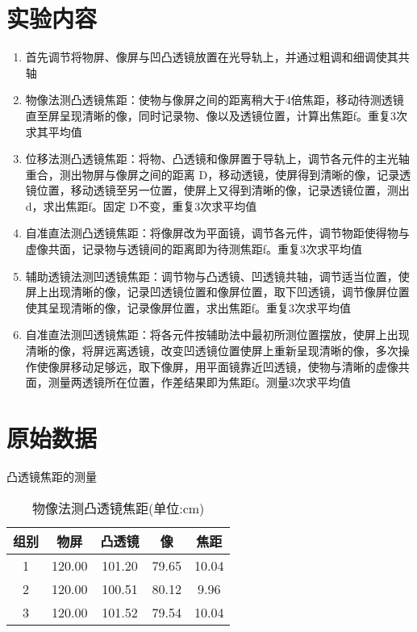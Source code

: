 \documentclass[UTF8]{ctexart}
\title{}
\author{}
\date{}
\begin{document}
\begin{titlepage}		
		
\end{titlepage}


\section{实验内容}

\begin{enumerate}
    \item 首先调节将物屏、像屏与凹凸透镜放置在光导轨上，并通过粗调和细调使其共轴
    \item 物像法测凸透镜焦距：使物与像屏之间的距离稍大于4倍焦距，移动待测透镜直至屏呈现清晰的像，同时记录物、像以及透镜位置，计算出焦距f。重复3次求其平均值
    \item 位移法测凸透镜焦距：将物、凸透镜和像屏置于导轨上，调节各元件的主光轴重合，测出物屏与像屏之间的距离 D，移动透镜，使屏得到清晰的像，记录透镜位置，移动透镜至另一位置，使屏上又得到清晰的像，记录透镜位置，测出 d，求出焦距f。固定 D不变，重复3次求平均值
    \item 自准直法测凸透镜焦距：将像屏改为平面镜，调节各元件，调节物距使得物与虚像共面，记录物与透镜间的距离即为待测焦距f。重复3次求平均值
    \item 辅助透镜法测凹透镜焦距：调节物与凸透镜、凹透镜共轴，调节适当位置，使屏上出现清晰的像，记录凹透镜位置和像屏位置，取下凹透镜，调节像屏位置使其呈现清晰的像，记录像屏位置，求出焦距f。重复3次求平均值
    \item 自准直法测凹透镜焦距：将各元件按辅助法中最初所测位置摆放，使屏上出现清晰的像，将屏远离透镜，改变凹透镜位置使屏上重新呈现清晰的像，多次操作使像屏移动足够远，取下像屏，用平面镜靠近凹透镜，使物与清晰的虚像共面，测量两透镜所在位置，作差结果即为焦距f。测量3次求平均值
\end{enumerate}





\section{原始数据}

凸透镜焦距的测量

\begin{table}[H]
\centering
\caption{物像法测凸透镜焦距(单位:cm)}
\begin{tabular}{|c|c|c|c|c|}
\hline
 组别  & 物屏 & 凸透镜 & 像 &  焦距  \\
 \hline
  1   &  120.00 & 101.20 & 79.65 & 10.04 \\
\hline
  2   &  120.00 & 100.51 & 80.12 & 9.96 \\
\hline
  3   &  120.00 & 101.52 & 79.54 & 10.04 \\
\hline
\end{tabular}
\end{table}
\end{document}
